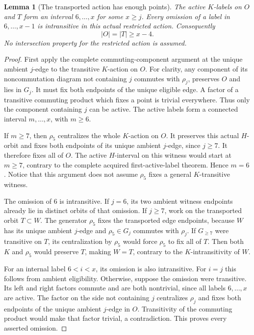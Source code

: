 \documentclass[11pt,a4paper]{article}
\newtheorem{lemma}{Lemma}
\begin{document}
\begin{lemma}[The transported action has enough points]
The active $K$-labels on $O$ and $T$ form an interval
$6,\ldots,x$ for some $x\ge j$. Every omission of a
label in $6,\ldots,x-1$ is intransitive in this actual
restricted action. Consequently
\[
                         |O|=|T|\ge x-4.
\]
No intersection property for the restricted action is assumed.
\end{lemma}
\begin{proof}
First apply the complete commuting-component argument
at the unique ambient $j$-edge to the transitive
$K$-action on $O$. For clarity, any component of its
noncommutation diagram not containing $j$ commutes
with $\rho_j$, preserves $O$ and lies in $G_j$.
It must fix both endpoints of the unique eligible
edge. A factor of a transitive commuting product
which fixes a point is trivial everywhere. Thus
only the component containing $j$ can be active.
The active labels form a connected interval $m,\ldots,x$,
with $m\ge6$.

If $m\ge7$, then $\rho_5$ centralizes the whole
$K$-action on $O$. It preserves this actual $H$-orbit
and fixes both endpoints of its unique ambient
$j$-edge, since $j\ge7$. It therefore fixes all
of $O$. The active $H$-interval on this witness
would start at $m\ge7$, contrary to the complete
acquired first-active-label theorem. Hence $m=6$.
Notice that this argument does not assume
$\rho_5$ fixes a general $K$-transitive witness.

The omission of $6$ is intransitive. If $j=6$,
its two ambient witness endpoints already lie in
distinct orbits of that omission. If $j\ge7$,
work on the transported orbit $T\subset W$.
The generator $\rho_5$ fixes the transported edge
endpoints, because $W$ has its unique ambient
$j$-edge and $\rho_5\in G_j$ commutes with
$\rho_j$. If $G_{\ge7}$ were transitive on $T$,
its centralization by $\rho_5$ would force
$\rho_5$ to fix all of $T$. Then both $K$
and $\rho_5$ would preserve $T$, making $W=T$,
contrary to the $K$-intransitivity of $W$.

For an internal label $6<i<x$, its omission is
also intransitive. For $i=j$ this follows from
ambient eligibility. Otherwise, suppose the
omission were transitive. Its left and right
factors commute and are both nontrivial, since
all labels $6,\ldots,x$ are active. The factor
on the side not containing $j$ centralizes
$\rho_j$ and fixes both endpoints of the unique
ambient $j$-edge in $O$. Transitivity of the
commuting product would make that factor trivial,
a contradiction. This proves every asserted omission.


\end{proof}
\end{document}
